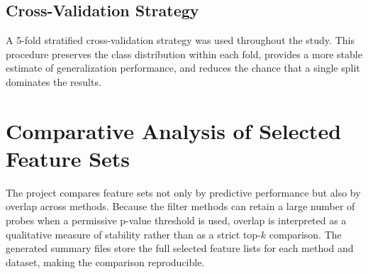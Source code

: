 \subsection{Cross-Validation Strategy}

A 5-fold stratified cross-validation strategy was used throughout the study. This procedure preserves the class distribution within each fold, provides a more stable estimate of generalization performance, and reduces the chance that a single split dominates the results.

\section{Comparative Analysis of Selected Feature Sets}

The project compares feature sets not only by predictive performance but also by overlap across methods. Because the filter methods can retain a large number of probes when a permissive p-value threshold is used, overlap is interpreted as a qualitative measure of stability rather than as a strict top-$k$ comparison. The generated summary files store the full selected feature lists for each method and dataset, making the comparison reproducible.
